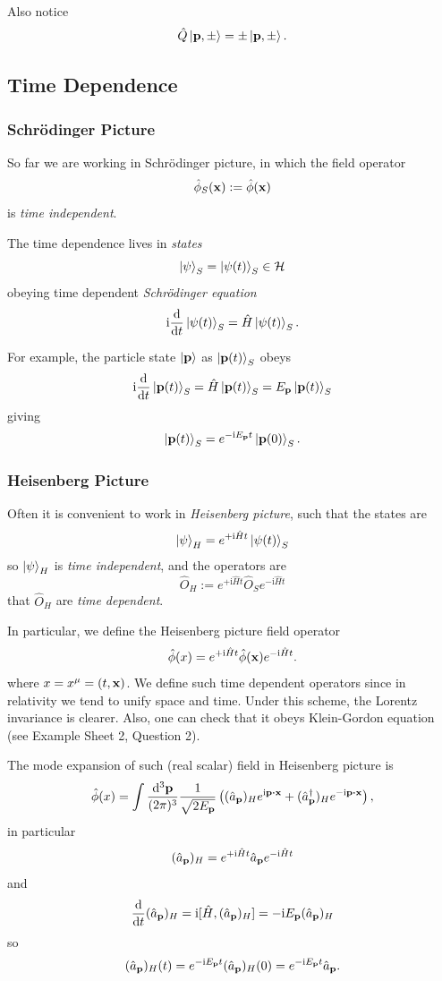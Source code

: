 \documentclass[a4paper,11pt]{article}
\begin{document}
	Also notice
	\[
		\hat Q \ket{\vb p, \pm} = \pm \ket{\vb p, \pm}.
	\]

	\subsection{Time Dependence}
	
	\subsubsection{Schr\"odinger Picture}	

	So far we are working in Schr\"odinger picture, in which the field operator
	\[
		\hat \phi_S(\vb x) := \hat \phi(\vb x)
	\]
	is \emph{time independent}.

	The time dependence lives in \emph{states}
	\[
		\ket{\psi}_S = \ket{\psi(t)}_S \in \mathcal{H}
	\]
	obeying time dependent \emph{Schr\"odinger equation}
	\[
		\mathrm{i} \dv{t} \ket{\psi(t)}_S = \hat H \ket{\psi(t)}_S.
	\]
	
	For example, the particle state $\ket{\vb p}$ as $\ket{\vb p(t)}_S$ obeys
	\[
		\mathrm{i} \dv{t} \ket{\vb p(t)}_S = \hat H \ket{\vb p(t)}_S = E _{\vb p} \ket{\vb p(t)}_S
	\]
	giving
	\[
		\ket{\vb p(t)}_S = e ^{- \mathrm{i} E _{\vb p}t}\ket{\vb p(0)}_S.
	\]

	\subsubsection{Heisenberg Picture}

	Often it is convenient to work in \emph{Heisenberg picture}, such that the states are
	\[
		\ket{\psi}_H = e ^{+ \mathrm{i} \hat H t} \ket{\psi (t)}_S
	\]
	so $\ket{\psi}_H$ is \emph{time independent}, and the operators are
	\[
		\hat O_H := e ^{+ \mathrm{i} \hat H t} \hat O_S e ^{- \mathrm{i} \hat H t}
	\]
	that $\hat O_H$ are \emph{time dependent}.

	In particular, we define the Heisenberg picture field operator
	\[
		\hat \phi(x) = e ^{+ \mathrm{i} \hat H t}\hat \phi(\vb x)e ^{- \mathrm{i}\hat H t}.
	\]
	where $x = x^\mu = (t, \vb x)$. We define such time dependent operators since in relativity we tend to unify space and time. Under this scheme, the Lorentz invariance is clearer. Also, one can check that it obeys Klein-Gordon equation (see Example Sheet 2, Question 2).

	The mode expansion of such (real scalar) field in Heisenberg picture is
	\[
		\hat \phi(x) = \int \ddk{\vb p}{3} \frac{1}{\sqrt{2 E _{\vb p}}} \left( (\hat a _{\vb p})_H e ^{\mathrm{i} \vb p \vdot \vb x} + (\hat a^{\dagger}_{\vb p})_H e ^{- \mathrm{i} \vb p \vdot \vb x} \right),
	\]
	in particular
	\[
		(\hat a _{\vb p})_H = e ^{+ \mathrm{i} \hat H t}\hat a _{\vb p} e ^{-\mathrm{i} \hat H t}
	\]
	and 
	\[
		\dv{t}\/(\hat a _{\vb p})_H = \mathrm{i} [\hat H, (\hat a _{\vb p})_H] = - \mathrm{i} E _{\vb p} (\hat a _{\vb p})_H
	\]
	so
	\[
		(\hat a _{\vb p})_H (t) = e ^{- \mathrm{i} E _{\vb p}t} (\hat a _{\vb p})_H(0) = e ^{-\mathrm{i} E _{\vb p}t}\hat a _{\vb p}.
	\]
	
\end{document}

